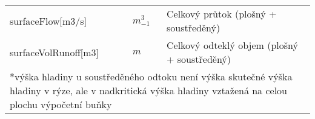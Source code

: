 \begin{table}[h!]
\begin{tabular}{llp{}}
 surfaceFlow[m3/s]   &  $m^3_{-1}$ & Celkový průtok (plošný + soustředěný)  \\
 surfaceVolRunoff[m3]   &   $m$  & Celkový odteklý objem (plošný + soustředěný) \\
  \hline
   \hline
   \multicolumn{3}{p{\textwidth}}{*výška hladiny u soustředěného odtoku není výška skutečné výška hladiny v rýze, ale v nadkritická výška hladiny vztažená na celou plochu výpočetní buňky}
 \end{tabular}

\end{table}
